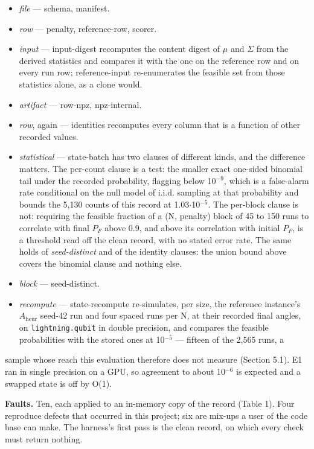 \documentclass[acmsmall,screen,review]{acmart}
\begin{document}
\begin{itemize}
\item \textit{file} --- schema, manifest.
\item \textit{row} --- penalty, reference-row, scorer.
\item \textit{input} --- input-digest recomputes the content digest of $\mu$ and $\Sigma$ from the derived statistics and compares it with the one on the reference row and on every run row; reference-input re-enumerates the feasible set from those statistics alone, as a clone would.
\item \textit{artifact} --- row-npz, npz-internal.
\item \textit{row}, again --- identities recomputes every column that is a function of other recorded values.
\item \textit{statistical} --- state-batch has two clauses of different kinds, and the difference matters. The per-count clause is a test: the smaller exact one-sided binomial tail under the recorded probability, flagging below 10$^{-9}$, which is a false-alarm rate conditional on the null model of i.i.d. sampling at that probability and bounds the 5,130 counts of this record at 1.03$\cdot$10$^{-5}$. The per-block clause is not: requiring the feasible fraction of a (N, penalty) block of 45 to 150 runs to correlate with final $P_{F}$ above 0.9, and above its correlation with initial $P_{F}$, is a threshold read off the clean record, with no stated error rate. The same holds of \textit{seed-distinct} and of the identity clauses: the union bound above covers the binomial clause and nothing else.
\item \textit{block} --- seed-distinct.
\item \textit{recompute} --- state-recompute re-simulates, per size, the reference instance's $A_{\mathrm{heur}}$ seed-42 run and four spaced runs per N, at their recorded final angles, on \texttt{lightning.qubit} in double precision, and compares the feasible probabilities with the stored ones at 10$^{-5}$ --- fifteen of the 2,565 runs, a
\end{itemize}
sample whose reach this evaluation therefore does not measure (Section 5.1). E1 ran in single precision on a GPU, so agreement to about 10$^{-6}$ is expected and a swapped state is off by O(1).


\textbf{Faults.} Ten, each applied to an in-memory copy of the record (Table 1). Four reproduce defects that occurred in this project; six are mix-ups a user of the code base can make. The harness's first pass is the clean record, on which every check must return nothing.
\end{document}
